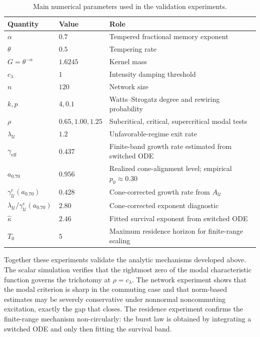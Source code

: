 \documentclass[11pt]{article}
\theoremstyle{plain}
\theoremstyle{definition}
\theoremstyle{remark}
\newcommand{\branch}{\rho}
\newcommand{\HR}{\mathcal{U}}
\begin{document}
\begin{table}[H]
    \centering
    \caption{Main numerical parameters used in the validation experiments.}
    \label{tab:numerical-validation-parameters}
    \begin{tabular}{lll}
        \toprule
        Quantity & Value & Role \\
        \midrule
        $\alpha$ & $0.7$ & Tempered fractional memory exponent \\
        $\theta$ & $0.5$ & Tempering rate \\
        $G=\theta^{-\alpha}$ & $1.6245$ & Kernel mass \\
        $c_\lambda$ & $1$ & Intensity damping threshold \\
        $n$ & $120$ & Network size \\
        $k,p$ & $4,0.1$ & Watts--Strogatz degree and rewiring probability \\
        $\branch$ & $0.65,1.00,1.25$ & Subcritical, critical, supercritical modal tests \\
        $\lambda_\HR$ & $1.2$ & Unfavorable-regime exit rate \\
        $\gamma_{\mathrm{eff}}$ & $0.437$ & Finite-band growth rate estimated from switched ODE \\
        $a_{0.70}$ & $0.956$ & Realized cone-alignment level; empirical $p_0\approx0.30$ \\
        $\gamma_\HR^{\mathrm c}(a_{0.70})$ & $0.428$ & Cone-corrected growth rate from $A_\HR$ \\
        $\lambda_\HR/\gamma_\HR^{\mathrm c}(a_{0.70})$ & $2.80$ & Cone-corrected exponent diagnostic \\
        $\widehat\kappa$ & $2.46$ & Fitted survival exponent from switched ODE \\
        $T_0$ & $5$ & Maximum residence horizon for finite-range scaling \\
        \bottomrule
    \end{tabular}
\end{table}

Together these experiments validate the analytic mechanisms developed above. The scalar simulation
verifies that the rightmost zero of the modal characteristic function governs the trichotomy at
$\branch=c_\lambda$. The network experiment shows that the modal criterion is sharp in the
commuting case and that norm-based estimates may be severely conservative under nonnormal
noncommuting excitation, exactly the gap that  closes. The residence
experiment confirms the finite-range mechanism non-circularly: the burst law is obtained by
integrating a switched ODE and only then fitting the survival band.
\end{document}

